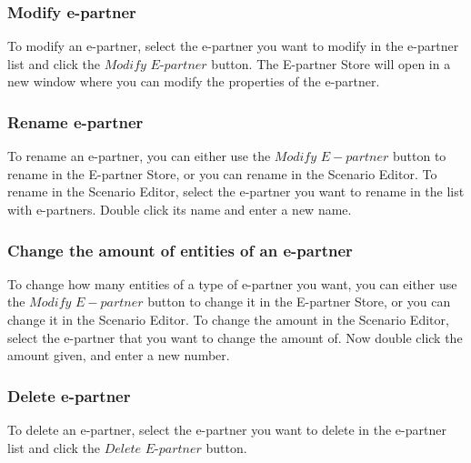 \documentclass[11pt,a4paper]{article}
\begin{document}
\subsubsection{Modify e-partner}
To modify an e-partner, select the e-partner you want to modify in the e-partner list and click the $Modify$ $E$-$partner$ button. The E-partner Store will open in a new window where you can modify the properties of the e-partner.

\subsubsection{Rename e-partner}
To rename an e-partner, you can either use the $Modify$ $E-partner$ button to rename in the E-partner Store, or you can rename in the Scenario Editor. To rename in the Scenario Editor, select the e-partner you want to rename in the list with e-partners. Double click its name and enter a new name.

\subsubsection{Change the amount of entities of an e-partner}
To change how many entities of a type of e-partner you want, you can either use the $Modify$ $E-partner$ button to change it in the E-partner Store, or you can change it in the Scenario Editor. To change the amount in the Scenario Editor, select the e-partner that you want to change the amount of. Now double click the amount given, and enter a new number.

\subsubsection{Delete e-partner}
To delete an e-partner, select the e-partner you want to delete in the e-partner list and click the $Delete$ $E$-$partner$ button.
\end{document}
